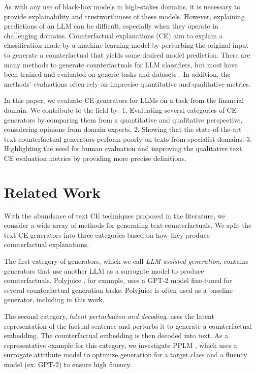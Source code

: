 \documentclass[11pt]{article}
\begin{document}
As with any use of black-box models in high-stakes domains, it is necessary to provide explainability and trustworthiness of these models. However, explaining predictions of an LLM can be difficult, especially when they operate in challenging domains. Counterfactual explanations (CE) \cite{wachter_counterfactual_2018} aim to explain a classification made by a machine learning model by perturbing the original input to generate a counterfactual that yields some desired model prediction. There are many methods to generate counterfactuals for LLM classifiers, but most have been trained and evaluated on generic tasks and datasets \cite{wu_polyjuice_2021}. In addition, the methods' evaluations often rely on imprecise quantitative and qualitative metrics.

In this paper, we evaluate CE generators for LLMs on a task from the financial domain. We contribute to the field by: 1. Evaluating several categories of CE generators by comparing them from a quantitative and qualitative perspective, considering opinions from domain experts. 2. Showing that the state-of-the-art text counterfactual generators perform poorly on texts from specialist domains. 3. Highlighting the need for human evaluation and improving the qualitative text CE evaluation metrics by providing more precise definitions.

\section{Related Work}

With the abundance of text CE techniques proposed in the literature, we consider a wide array of methods for generating text counterfactuals. We split the text CE generators into three categories based on how they produce counterfactual explanations.

The first category of generators, which we call \textit{LLM-assisted generation}, contains generators that use another LLM as a surrogate model to produce counterfactuals. Polyjuice \cite{wu_polyjuice_2021}, for example, uses a GPT-2 model fine-tuned for several counterfactual generation tasks. Polyjuice is often used as a baseline generator, including in this work.

The second category, \textit{latent perturbation and decoding}, uses the latent representation of the factual sentence and perturbs it to generate a counterfactual embedding. The counterfactual embedding is then decoded into text. As a representative example for this category, we investigate PPLM \cite{dathathri_plug_2019}, which uses a surrogate attribute model to optimize generation for a target class and a fluency model (ex. GPT-2) to ensure high fluency.
\end{document}
